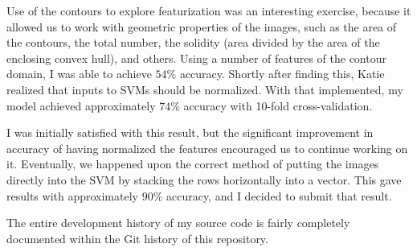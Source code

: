 \documentclass[12pt]{article}
\begin{document}
Use of the contours to explore featurization was an interesting exercise,
because it allowed us to work with geometric properties of the images, such as
the area of the contours, the total number, the solidity (area divided by the
area of the enclosing convex hull), and others. Using a number of features of
the contour domain, I was able to achieve $54\%$ accuracy. Shortly after finding
this, Katie realized that inputs to SVMs should be normalized. With that
implemented, my model achieved approximately $74\%$ accuracy with 10-fold
cross-validation.

I was initially satisfied with this result, but the significant improvement in
accuracy of having normalized the features encouraged us to continue working on
it. Eventually, we happened upon the correct method of putting the images
directly into the SVM by stacking the rows horizontally into a vector. This gave
results with approximately $90\%$ accuracy, and I decided to submit that result.

The entire development history of my source code is fairly completely documented
within the Git history of this repository.
\end{document}
